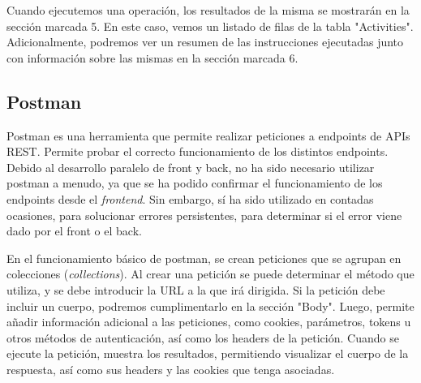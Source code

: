 Cuando ejecutemos una operación, los resultados de la misma se mostrarán en la sección marcada 5. En este caso, vemos un listado de filas de la tabla "Activities". Adicionalmente, podremos ver un resumen de las instrucciones ejecutadas junto con información sobre las mismas en la sección marcada 6.

\subsection{Postman}
Postman es una herramienta que permite realizar peticiones a endpoints de APIs REST. Permite probar el correcto funcionamiento de los distintos endpoints. Debido al desarrollo paralelo de front y back, no ha sido necesario utilizar postman a menudo, ya que se ha podido confirmar el funcionamiento de los endpoints desde el \textit{frontend}. Sin embargo, sí ha sido utilizado en contadas ocasiones, para solucionar errores persistentes, para determinar si el error viene dado por el front o el back.

En el funcionamiento básico de postman, se crean peticiones que se agrupan en colecciones (\textit{collections}). Al crear una petición se puede determinar el método que utiliza, y se debe introducir la URL a la que irá dirigida. Si la petición debe incluir un cuerpo, podremos cumplimentarlo en la sección "Body". Luego, permite añadir información adicional a las peticiones, como cookies, parámetros, tokens u otros métodos de autenticación, así como los headers de la petición. Cuando se ejecute la petición, muestra los resultados, permitiendo visualizar el cuerpo de la respuesta, así como sus headers y las cookies que tenga asociadas.
